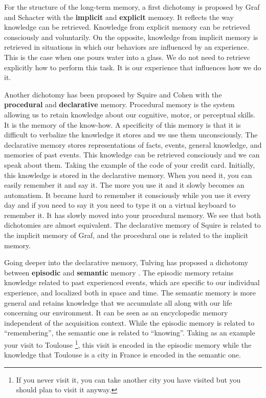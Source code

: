For the structure of the long-term memory, a first dichotomy is proposed by Graf and Schacter \cite{graf_1985_implicit} with the \textbf{implicit} and \textbf{explicit} memory. It reflects the way knowledge can be retrieved. Knowledge from explicit memory can be retrieved consciously and voluntarily. On the opposite, knowledge from implicit memory is retrieved in situations in which our behaviors are influenced by an experience. This is the case when one pours water into a glass. We do not need to retrieve explicitly how to perform this task. It is our experience that influences how we do it.

Another dichotomy has been proposed by Squire and Cohen \cite{squire_1982_remote} with the \textbf{procedural} and \textbf{declarative} memory. Procedural memory is the system allowing us to retain knowledge about our cognitive, motor, or perceptual skills. It is the memory of the know-how. A specificity of this memory is that it is difficult to verbalize the knowledge it stores and we use them unconsciously. The declarative memory stores representations of facts, events, general knowledge, and memories of past events. This knowledge can be retrieved consciously and we can speak about them. Taking the example of the code of your credit card. Initially, this knowledge is stored in the declarative memory. When you need it, you can easily remember it and say it. The more you use it and it slowly becomes an automatism. It became hard to remember it consciously while you use it every day and if you need to say it you need to type it on a virtual keyboard to remember it. It has slowly moved into your procedural memory. We see that both dichotomies are almost equivalent. The declarative memory of Squire is related to the implicit memory of Graf, and the procedural one is related to the implicit memory.

Going deeper into the declarative memory, Tulving has proposed a dichotomy between \textbf{episodic} and \textbf{semantic} memory \cite{tulving_1995_organization}. The episodic memory retains knowledge related to past experienced events, which are specific to our individual experience, and localized both in space and time. The semantic memory is more general and retains knowledge that we accumulate all along with our life concerning our environment. It can be seen as an encyclopedic memory independent of the acquisition context. While the episodic memory is related to ``remembering'', the semantic one is related to ``knowing''. Taking as an example your visit to Toulouse \footnote{If you never visit it, you can take another city you have visited but you should plan to visit it anyway.}, this visit is encoded in the episodic memory while the knowledge that Toulouse is a city in France is encoded in the semantic one.

